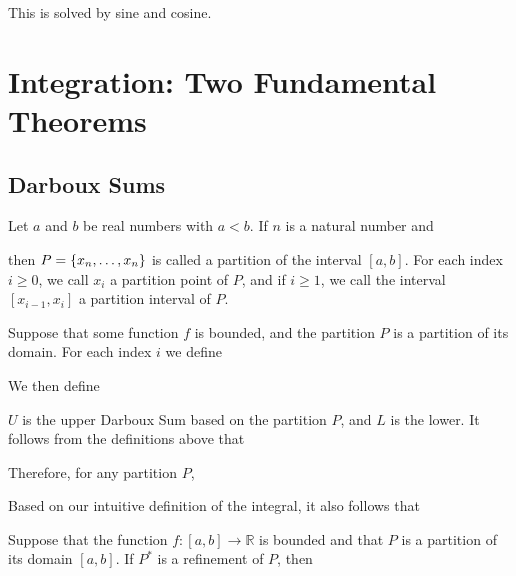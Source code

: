     This is solved by sine and cosine.

\section{Integration: Two Fundamental Theorems}

    \subsection{Darboux Sums}

    \begin{definition}[Partition]
        Let $a$ and $b$ be real numbers with $a < b$. If $n$ is a natural number and

        then $P={\left\{ x_n, \ldots, x_n \right\}}$ is called a partition of the interval $[a, b]$. For each index $i \ge 0$, we
        call $x_i$ a partition point of $P$, and if $i \ge 1$, we call the interval $[x_{i-1}, x_i]$ a partition
        interval of $P$.
    \end{definition}

    Suppose that some function $f$ is bounded, and the partition $P$ is a partition of its domain. For each index $i$ we
    define

    We then define

    $U$ is the upper Darboux Sum based on the partition $P$, and $L$ is the lower. It follows from the definitions above
    that

    Therefore, for any partition $P$,

    Based on our intuitive definition of the integral, it also follows that

    \begin{thm}
        Suppose that the function $f:[a, b] \to \mathbb{R}$ is bounded and that $P$ is a partition of its domain $[a,
        b]$. If $P^*$ is a refinement of $P$, then
    \end{thm}

